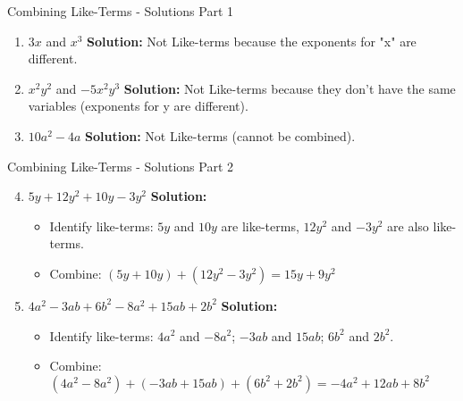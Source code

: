 \documentclass[aspectratio=169]{beamer}
\begin{document}
\begin{frame}{Combining Like-Terms - Solutions Part 1}
    \begin{tcolorbox}[colback=lightgray,colframe=accent,title=Detailed Solutions]
        \footnotesize
        \begin{enumerate}
            \setlength{\itemsep}{0.5em}
            \item $3x$ and $x^3$
            \quad \textbf{Solution:} Not Like-terms because the exponents for "x" are different.
            
            \item $x^2y^2$ and $-5x^2y^3$
            \quad \textbf{Solution:} Not Like-terms because they don't have the same variables (exponents for y are different).
            
            \item $10a^2 - 4a$
            \quad \textbf{Solution:} Not Like-terms (cannot be combined).
        \end{enumerate}
    \end{tcolorbox}
\end{frame}

\begin{frame}{Combining Like-Terms - Solutions Part 2}
    \begin{tcolorbox}[colback=lightgray,colframe=accent,title=Detailed Solutions]
        \footnotesize
        \begin{enumerate}
            \setcounter{enumi}{3}
            \setlength{\itemsep}{0.5em}
            \item $5y + 12y^2 + 10y - 3y^2$
            \quad \textbf{Solution:}
            \begin{itemize}
                \item Identify like-terms: $5y$ and $10y$ are like-terms, $12y^2$ and $-3y^2$ are also like-terms.
                \item Combine: $(5y + 10y) + (12y^2 - 3y^2) = 15y + 9y^2$
            \end{itemize}
            
            \item $4a^2 - 3ab + 6b^2 - 8a^2 + 15ab + 2b^2$
            \quad \textbf{Solution:}
            \begin{itemize}
                \item Identify like-terms: $4a^2$ and $-8a^2$; $-3ab$ and $15ab$; $6b^2$ and $2b^2$.
                \item Combine: $(4a^2 - 8a^2) + (-3ab + 15ab) + (6b^2 + 2b^2) = -4a^2 + 12ab + 8b^2$
            \end{itemize}
        \end{enumerate}
    \end{tcolorbox}
\end{frame}
\end{document}

